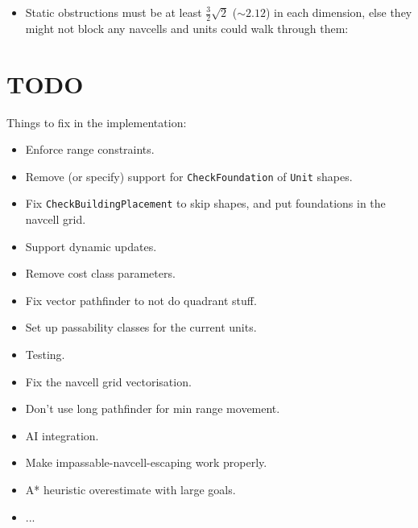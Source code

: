 \documentclass[a4paper,10pt]{article}
\begin{document}
\begin{itemize}
\item Static obstructions must be at least $\frac{3}{2}\sqrt{2}$ ($\sim2.12$)
in each dimension, else they might not block any navcells and units could
walk through them:


\end{itemize}

\section{TODO}

Things to fix in the implementation:
\begin{itemize}
 \item Enforce range constraints.
 \item Remove (or specify) support for \texttt{CheckFoundation} of \texttt{Unit} shapes.
 \item Fix \texttt{CheckBuildingPlacement} to skip shapes, and put foundations in the navcell grid.
 \item Support dynamic updates.
 \item Remove cost class parameters.
 \item Fix vector pathfinder to not do quadrant stuff.
 \item Set up passability classes for the current units.
 \item Testing.
 \item Fix the navcell grid vectorisation.
 \item Don't use long pathfinder for min range movement.
 \item AI integration.
 \item Make impassable-navcell-escaping work properly.
 \item A* heuristic overestimate with large goals.
 \item ...
\end{itemize}
\end{document}
